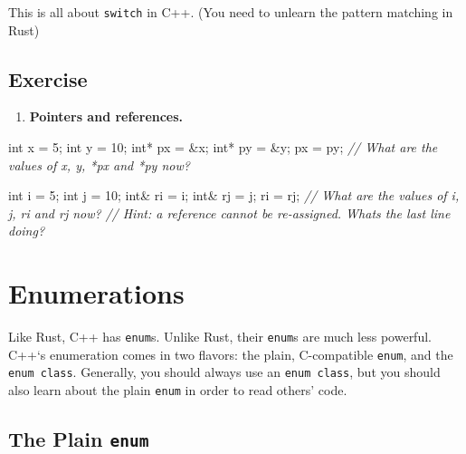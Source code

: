 \documentclass[
]{book}
\newenvironment{Shaded}{\begin{snugshade}}{\end{snugshade}}
\newcommand{\CommentTok}[1]{\textcolor[rgb]{0.56,0.35,0.01}{\textit{#1}}}
\newcommand{\DataTypeTok}[1]{\textcolor[rgb]{0.13,0.29,0.53}{#1}}
\newcommand{\DecValTok}[1]{\textcolor[rgb]{0.00,0.00,0.81}{#1}}
\newcommand{\NormalTok}[1]{#1}
\providecommand{\tightlist}{%
  \setlength{\itemsep}{0pt}\setlength{\parskip}{0pt}}
\begin{document}
This is all about \texttt{switch} in C++. (You need to unlearn the pattern matching in Rust)

\hypertarget{exercise}{%
\section*{Exercise}\label{exercise}}

\begin{enumerate}
\def\labelenumi{\arabic{enumi}.}
\tightlist
\item
  \textbf{Pointers and references.}
\end{enumerate}

\begin{Shaded}
\begin{Highlighting}[]
\DataTypeTok{int}\NormalTok{ x = }\DecValTok{5}\NormalTok{;}
\DataTypeTok{int}\NormalTok{ y = }\DecValTok{10}\NormalTok{;}
\DataTypeTok{int}\NormalTok{* px = \&x;}
\DataTypeTok{int}\NormalTok{* py = \&y;}
\NormalTok{px = py;}
\CommentTok{// What are the values of x, y, *px and *py now?}

\DataTypeTok{int}\NormalTok{ i = }\DecValTok{5}\NormalTok{;}
\DataTypeTok{int}\NormalTok{ j = }\DecValTok{10}\NormalTok{;}
\DataTypeTok{int}\NormalTok{\& ri = i;}
\DataTypeTok{int}\NormalTok{\& rj = j;}
\NormalTok{ri = rj;}
\CommentTok{// What are the values of i, j, ri and rj now?}
\CommentTok{// Hint: a reference cannot be re{-}assigned. What\textquotesingle{}s the last line doing?}
\end{Highlighting}
\end{Shaded}

\hypertarget{enumerations}{%
\chapter{Enumerations}\label{enumerations}}

Like Rust, C++ has \texttt{enum}s. Unlike Rust, their \texttt{enum}s are much less powerful. C++`s enumeration
comes in two flavors: the plain, C-compatible \texttt{enum}, and the \texttt{enum\ class}. Generally, you should
always use an \texttt{enum\ class}, but you should also learn about the plain \texttt{enum} in order to read
others' code.

\hypertarget{the-plain-enum}{%
\section{\texorpdfstring{The Plain \texttt{enum}}{The Plain enum}}\label{the-plain-enum}}
\end{document}
